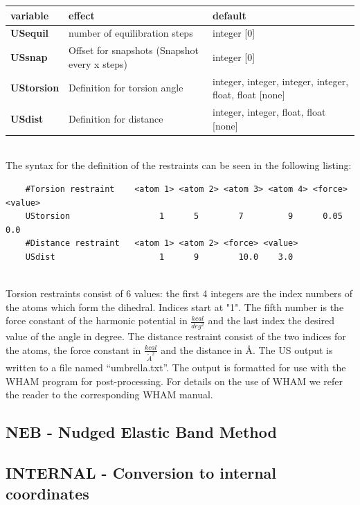 \documentclass[10pt,a4paper]{article} %
\newif\ifdevmode %
\begin{document}
	\begin{tabularx}{\textwidth}{l|X|X}
		variable & effect & default \\
		\hline
		\textbf{USequil} & number of equilibration steps & integer [0] \\
		\textbf{USsnap} & Offset for snapshots (Snapshot every x steps) & integer [0]  \\
		\textbf{UStorsion} & Definition for torsion angle & integer, integer, integer, integer, float, float [none] \\
		\textbf{USdist} & Definition for distance & integer, integer, float, float [none] \\
	\end{tabularx}~\\

	The syntax for the definition of the restraints can be seen in the following listing:\\

	\begin{lstlisting}
	#Torsion restraint    <atom 1> <atom 2> <atom 3> <atom 4> <force> <value>
	UStorsion                  1      5        7         9      0.05    0.0
	#Distance restraint   <atom 1> <atom 2> <force> <value>
	USdist                     1      9        10.0    3.0
	\end{lstlisting}
	~\\
	Torsion restraints consist of 6 values: the first 4 integers are the index numbers of the atoms which form the dihedral. Indices start at "1". The fifth number is the force constant of the harmonic potential in $\frac{kcal}{deg^2}$ and the last index the desired value of the angle in degree.
	The distance restraint consist of the two indices for the atoms, the force constant in $\frac{kcal}{{\mathring{A}}^2}$ and the distance in \AA.
	The \acl{US} output is written to a file named ``umbrella.txt''. The output is formatted for use with the \ac{WHAM} program\supercite{wham1, wham2} for post-processing. For details on the use of WHAM we refer the reader to the corresponding \ac{WHAM} manual.

	\subsection{NEB - Nudged Elastic Band Method}	
	\ifdevmode \colorbox{red}{write something here} \fi	

	\subsection{INTERNAL - Conversion to internal coordinates}	
	\ifdevmode \colorbox{red}{write something here} \fi	
\end{document}
